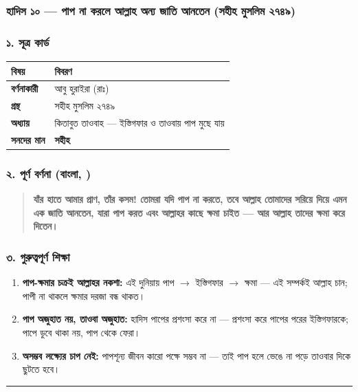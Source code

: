 \subsubsection*{হাদিস ১০ — পাপ না করলে আল্লাহ অন্য জাতি আনতেন (সহীহ মুসলিম ২৭৪৯)}

\subsubsection*{১. সূত্র কার্ড}

\begin{table}[h]\centering\small
\begin{tabular}{ll}
বিষয় & বিবরণ \\
\hline
\textbf{বর্ণনাকারী} & আবু হুরাইরা (রাঃ) \\
\textbf{গ্রন্থ} & সহীহ মুসলিম ২৭৪৯ \\
\textbf{অধ্যায়} & কিতাবুত তাওবাহ — ইস্তিগফার ও তাওবায় পাপ মুছে যায় \\
\textbf{সনদের মান} & \textbf{সহীহ} \\
\hline
\end{tabular}
\end{table}

\subsubsection*{২. পূর্ণ বর্ণনা (বাংলা, )}

\begin{quote}
\textbf{যাঁর হাতে আমার প্রাণ, তাঁর কসম! তোমরা যদি পাপ না করতে, তবে আল্লাহ তোমাদের সরিয়ে দিয়ে এমন এক জাতি আনতেন, যারা পাপ করত এবং আল্লাহর কাছে ক্ষমা চাইত — আর আল্লাহ তাদের ক্ষমা করে দিতেন।}
\end{quote}

\subsubsection*{৩. গুরুত্বপূর্ণ শিক্ষা}

\begin{enumerate}
\item \textbf{পাপ-ক্ষমার চক্রই আল্লাহর নকশা:} এই দুনিয়ায় পাপ $\rightarrow$ ইস্তিগফার $\rightarrow$ ক্ষমা — এই সম্পর্কই আল্লাহ চান; পাপী না থাকলে ক্ষমার দরজা বন্ধ থাকত।
\item \textbf{পাপ অজুহাত নয়, তাওবা অজুহাত:} হাদিস পাপের প্রশংসা করে না — প্রশংসা করে পাপের পরের ইস্তিগফারকে; পাপে ডুবে থাকা নয়, পাপ থেকে ফেরা।
\item \textbf{অসম্ভব লক্ষ্যের চাপ নেই:} পাপশূন্য জীবন কারো পক্ষে সম্ভব না — তাই পাপ হলে ভেঙে না পড়ে তাওবার দিকে ছুটতে হবে।
\end{enumerate}
\medskip\hrule\medskip

